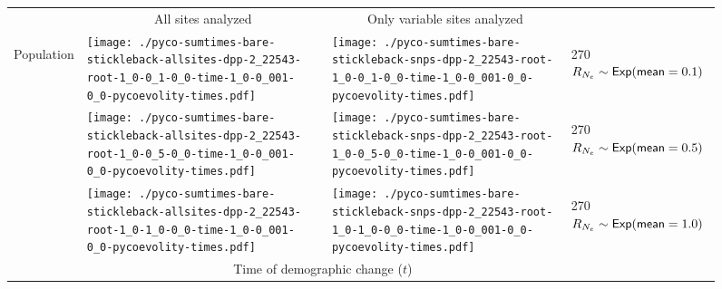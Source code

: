 \documentclass[border=10pt,varwidth=30cm]{standalone}
\begin{document}
\begin{figure}
    \centering
    \begin{tabular}{@{}llll@{}}
        & \multicolumn{1}{c}{\large All sites analyzed} & \multicolumn{1}{c}{\large Only variable sites analyzed} & \\[1ex]
        \multirow{2}{*}[-4em]{\begin{sideways}\large Population\end{sideways}}
        & \texttt{[image: ./pyco-sumtimes-bare-stickleback-allsites-dpp-2\_22543-root-1\_0-0\_1-0\_0-time-1\_0-0\_001-0\_0-pycoevolity-times.pdf]}
        & \texttt{[image: ./pyco-sumtimes-bare-stickleback-snps-dpp-2\_22543-root-1\_0-0\_1-0\_0-time-1\_0-0\_001-0\_0-pycoevolity-times.pdf]}
        & \multirow{1}{*}[11em]{\begin{rotate}{270}$R_{N_e} \sim \textrm{\sffamily Exp}(\textrm{\sffamily mean}=0.1)$\end{rotate}} \\
        & \texttt{[image: ./pyco-sumtimes-bare-stickleback-allsites-dpp-2\_22543-root-1\_0-0\_5-0\_0-time-1\_0-0\_001-0\_0-pycoevolity-times.pdf]}
        & \texttt{[image: ./pyco-sumtimes-bare-stickleback-snps-dpp-2\_22543-root-1\_0-0\_5-0\_0-time-1\_0-0\_001-0\_0-pycoevolity-times.pdf]}
        & \multirow{1}{*}[11em]{\begin{rotate}{270}$R_{N_e} \sim \textrm{\sffamily Exp}(\textrm{\sffamily mean}=0.5)$\end{rotate}} \\
        & \texttt{[image: ./pyco-sumtimes-bare-stickleback-allsites-dpp-2\_22543-root-1\_0-1\_0-0\_0-time-1\_0-0\_001-0\_0-pycoevolity-times.pdf]}
        & \texttt{[image: ./pyco-sumtimes-bare-stickleback-snps-dpp-2\_22543-root-1\_0-1\_0-0\_0-time-1\_0-0\_001-0\_0-pycoevolity-times.pdf]}
        & \multirow{1}{*}[11em]{\begin{rotate}{270}$R_{N_e} \sim \textrm{\sffamily Exp}(\textrm{\sffamily mean}=1.0)$\end{rotate}} \\
        & \multicolumn{2}{c}{\large Time of demographic change ($t$)} & 
    \end{tabular}
\end{figure}
\end{document}

